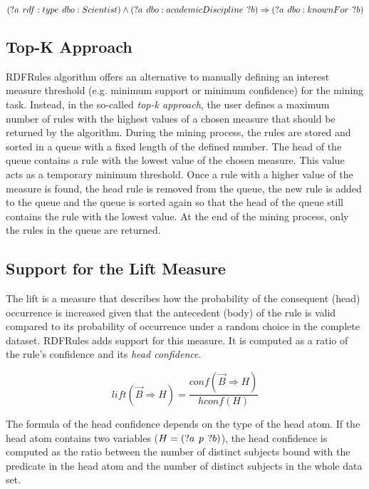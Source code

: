 $$(?a\hspace{0.4em} rdf:type \hspace{0.4em}dbo:Scientist) \land (?a\hspace{0.4em} dbo:academicDiscipline \hspace{0.4em}?b) \Rightarrow (?a\hspace{0.4em}dbo:knownFor \hspace{0.4em}?b)$$

\subsection{Top-K Approach}

RDFRules algorithm offers an alternative to manually defining an interest measure threshold (e.g. minimum support or minimum confidence) for the mining task. Instead, in the so-called \textit{top-k approach}, the user defines a maximum number of rules with the highest values of a chosen measure that should be returned by the algorithm. During the mining process, the rules are stored and sorted in a queue with a fixed length of the defined number. The head of the queue  contains a rule with the lowest value of the chosen measure. This value acts as a temporary minimum threshold. Once a rule with a higher value of the measure is found, the head rule is removed from the queue, the new rule is added to the queue and the queue is sorted again so that the head of the queue still contains the rule with the lowest value. At the end of the mining process, only the rules in the queue are returned. 

\subsection{Support for the Lift Measure}

The lift is a measure that describes how the probability of the consequent (head) occurrence is increased given that the antecedent (body) of the rule is valid compared to its probability of occurrence under a random choice in the complete dataset. RDFRules adds support for this measure. It is computed as a ratio of the rule's confidence and its \textit{head confidence}.

$$lift(\vec{B} \Rightarrow H) = \frac{conf(\vec{B} \Rightarrow H)}{hconf(H)}$$

The formula of the head confidence depends on the type of the head atom. If the head atom contains two variables ($H = (?a\hspace{0.4em}p\hspace{0.4em}?b)$), the head confidence is computed as the ratio between the number of distinct subjects bound with the predicate in the head atom and the number of distinct subjects in the whole data set.


